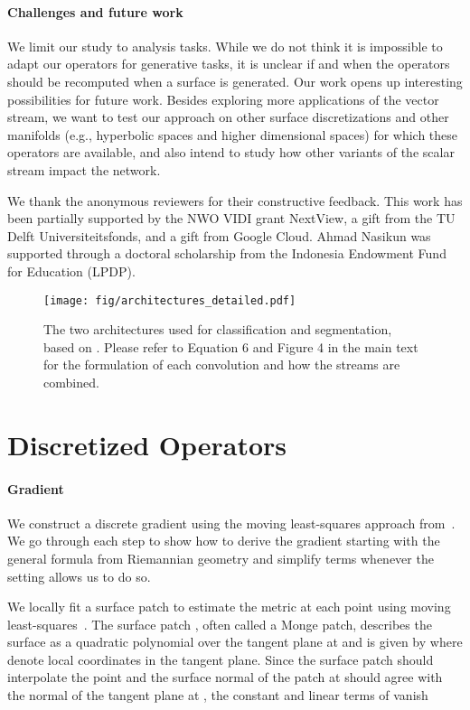 \documentclass[acmtog, authorversion]{acmart}
\begin{document}
\paragraph*{Challenges and future work}
We limit our study to analysis tasks. While we do not think it is impossible to adapt our operators for generative tasks, it is unclear if and when the operators should be recomputed when a surface is generated. Our work opens up interesting possibilities for future work. Besides exploring more applications of the vector stream, we want to test our approach on other surface discretizations and other manifolds (e.g., hyperbolic spaces and higher dimensional spaces) for which these operators are available, and also intend to study how other variants of the scalar stream impact the network. \begin{acks}
We thank the anonymous reviewers for their constructive feedback. This work has been partially supported by the NWO VIDI grant NextView, a gift from the TU Delft Universiteitsfonds, and a gift from Google Cloud. Ahmad Nasikun was supported through a doctoral scholarship from the Indonesia Endowment Fund for Education (LPDP).
\end{acks} 



\appendix
\begin{figure*}[t]
    \texttt{[image: fig/architectures\_detailed.pdf]}
    \caption{The two architectures used for classification and segmentation, based on \cite{Wang2019}. Please refer to Equation 6 and Figure 4 in the main text for the formulation of each convolution and how the streams are combined.}
    \label{fig:architecture}
    \centering
\end{figure*}

\section{Discretized Operators}
\paragraph{Gradient}
We construct a discrete gradient using the moving least-squares approach from~\cite{Liang2013SolvingPD}. We go through each step to show how to derive the gradient starting with the general formula from Riemannian geometry and simplify terms whenever the setting allows us to do so. 

We locally fit a surface patch to estimate the metric at each point  using moving least-squares~\cite{Nealen2004}.
The surface patch , often called a Monge patch, describes the surface as a quadratic polynomial  over the tangent plane at  and is given by  
where  denote local coordinates in the tangent plane. Since the surface patch should interpolate the point  and the surface normal of the patch at  should agree with the normal of the tangent plane at , the constant and linear terms of  vanish
\end{document}
